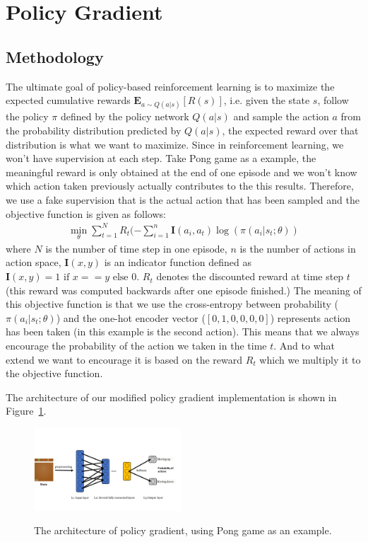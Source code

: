 \section{Policy Gradient}
\subsection{Methodology}
The ultimate goal of policy-based reinforcement learning is to maximize the 
expected cumulative rewards $\textbf{E}_{a \sim Q(a|s)}[R(s)]$, i.e. given 
the state $s$, follow the policy $\pi$ defined by the policy network $Q(a|s)$ and
sample the action $a$ from the probability distribution predicted by $Q(a|s)$, the 
expected reward over that distribution is what we want to maximize. Since in 
reinforcement learning, we won't have supervision at each step. Take Pong game 
as a example, the meaningful reward is only obtained at the end of one episode
and we won't know which action taken previously actually contributes to the 
this results. Therefore, we use a fake supervision that is the actual action 
that has been sampled and the objective function is given as follows:
\begin{equation*}
\begin{split}
\min_{\theta}\sum_{t=1}^N R_t (-\sum_{i=1}^{n}\textbf{I}(a_i, a_t)\log(\pi(a_i|s_t; \theta))
\end{split}
\end{equation*}
where $N$ is the number of time step in one episode, $n$ is the number of actions
in action space, $\textbf{I}(x, y)$ is an indicator function defined as $\textbf{I}(x, y) = 1 \text{ if } x==y \text{ else } 0$.
$R_t$ denotes the discounted reward at time step $t$ (this reward was computed backwards after one episode finished.)
The meaning of this objective function is that we use the cross-entropy between 
probability ($\pi(a_i|s_t; \theta)$) and the one-hot encoder vector ($[0,1,0,0,0,0]$) represents action has been taken
(in this example is the second action). This means that we always encourage the probability of the action 
we taken in the time $t$. And to what extend we want to encourage it is based on the reward $R_t$ which we 
multiply it to the objective function. 


The architecture of our modified policy gradient implementation is shown in Figure~\ref{fig:pg_picture}.

\begin{figure}[h!]
\centering
\includegraphics[width=0.49\textwidth]{./fig/policygradient.pdf} \\
\caption{The architecture of policy gradient, using Pong game as an example.}
\label{fig:pg_picture}
\end{figure}


